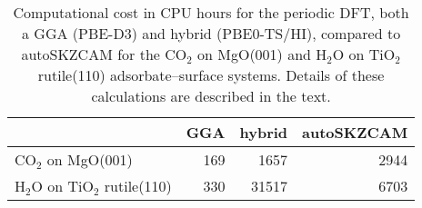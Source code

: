 \begin{table}
\caption{\label{tab:computational_cost}Computational cost in CPU hours for the periodic DFT, both a GGA (PBE-D3) and hybrid (PBE0-TS/HI), compared to autoSKZCAM for the CO$_2$ on MgO(001) and H$_2$O on TiO$_2$ rutile(110) adsorbate--surface systems. Details of these calculations are described in the text.}
\begin{tabular}{lrrr}
\toprule
 & GGA & hybrid & autoSKZCAM \\ 
\midrule
CO$_2$ on MgO(001) & 169 & 1657 & 2944 \\
H$_2$O on TiO$_2$ rutile(110) & 330 & 31517 & 6703 \\
\bottomrule
\end{tabular}
\end{table}